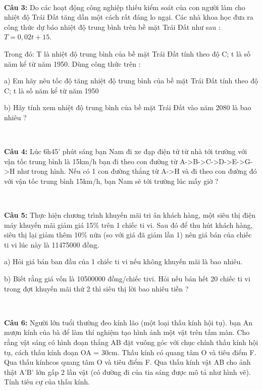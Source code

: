 \documentclass[12pt]{article}
\begin{document}
\     

\textbf{Câu 3:} Do các hoạt động công nghiệp thiếu kiểm soát của con người làm cho nhiệt độ Trái Đất tăng dần một cách rất đáng lo ngại. Các nhà khoa học đưa ra công thức dự báo nhiệt độ trung bình trên bề mặt Trái Đất như sau : $T = 0,02t + 15$. \par 
Trong đó: T là nhiệt độ trung bình của bề mặt Trái Đất tính theo độ C; t là số năm kể từ năm 1950. Dùng công thức trên : \par
a) Em hãy nêu tốc độ tăng nhiệt độ trung bình của bề mặt Trái Đất tính theo độ C; t là số năm kể từ năm 1950 \par
b) Hãy tính xem nhiệt độ trung bình của bề mặt Trái Đất vào năm 2080 là bao nhiêu ? 

\    

\textbf{Câu 4:} Lúc 6h45' phút sáng bạn Nam đi xe đạp điện tử từ nhà tới trường với vận tốc trung bình là 15km/h bạn đi theo con đường từ A->B->C->D->E->G->H như trong hình. Nếu có 1 con đường thẳng từ A->H và đi theo con đường đó với vận tốc trung bình 15km/h, bạn Nam sẽ tới trường lúc mấy giờ ? \par

\   

\textbf{Câu 5:} Thực hiện chương trình khuyến mãi tri ân khách hàng, một siêu thị điện máy khuyến mãi giảm giá 15\% trên 1 chiếc ti vi. Sau đó để thu hút khách hàng, siêu thị lại giảm thêm 10\% nữa (so với giá đã giảm lần 1) nên giá bán của chiếc ti vi lúc này là 11475000 đồng. \par
a) Hỏi giá bán ban đầu của 1 chiếc ti vi nếu không khuyến mãi là bao nhiêu. \par
b) Biết rằng giá vốn là 10500000 đồng/chiếc tivi. Hỏi nếu bán hết 20 chiếc ti vi trong đợt khuyến mãi thứ 2 thì siêu thị lời bao nhiêu tiền ? \par

\    

\textbf{Câu 6:} Người lớn tuổi thường đeo kính lão (một loại thấu kính hội tụ). bạn An mượn kính của bà để làm thí nghiệm tạo hình ảnh một vật trên tấm màn. Cho rằng vật sáng có hình đoạn thẳng AB đặt vuông góc với chục chính thấu kính hội tụ, cách thấu kính đoạn OA = 30cm. Thấu kính có quang tâm O và tiêu điểm F. Qua thấu kínhcos quang tâm O và tiêu điểm F. Qua thấu kính vật AB cho ảnh thật A'B' lớn gấp 2 lần vật (có đường đi của tia sáng được mô tả như hình vẽ). Tính tiêu cự của thấu kính. \par

\    
\end{document}
